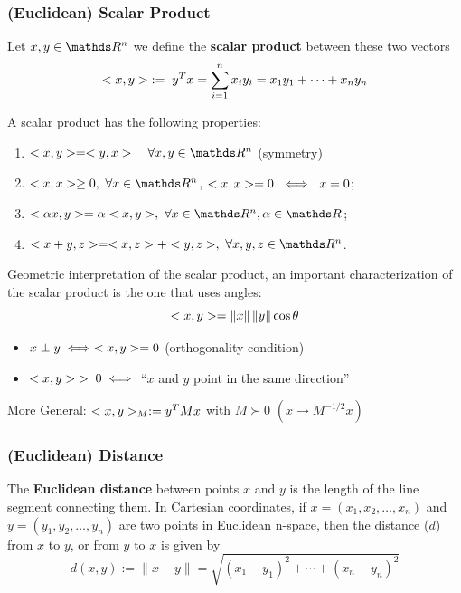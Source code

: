 \documentclass[computationalMathematics.tex]{subfiles}
\begin{document}


\subsubsection{(Euclidean) Scalar Product}

\begin{definition}
  Let $x, y \in \R^n$ we define the \textbf{scalar product} between these two vectors 
  \[
<x, y> \; := \; y^T x = \sum_{i=1}^n x_i y_i = x_1 y_1 + \cdots + x_n y_n
  \]
\end{definition}

\begin{proposition}
A scalar product has the following properties:
\begin{enumerate}
  \item $\ps{x}{y} = \ps{y}{x} \quad \forall x, y \in \R^n$ (symmetry)
  \item $\ps{x}{x} \ge 0,~\forall x \in \R^n$, $<x, x>=0~\iff~x=0$;
  \item $\ps{\alpha x}{y} = \alpha \ps{x}{y},~\forall x\in\R^n, \alpha \in \R$;
  \item $\ps{x + y}{z} = \ps{x}{z} + \ps{y}{z},~\forall x,y, z \in \R^n$.
\end{enumerate}
\end{proposition}

Geometric interpretation of the scalar product, an important characterization of the scalar product is the one that uses angles:
\[
  <x, y> = \left\lVert x\right\rVert \left\lVert y\right\rVert \cos \theta
\]
\begin{itemize}
    \item $x \perp y \iff <x, y> = 0$ (orthogonality condition)
    \item $<x, y> \; >\;  0 \iff$ ``$x$ and $y$ point in the same direction''
\end{itemize}

\noindent More General: $ <x, y>_M := {y}^{T}Mx $ with $M \succ 0$  $( x \longrightarrow M^{-1/2}x)$

\subsubsection{(Euclidean) Distance}
\begin{definition}
The \textbf{Euclidean distance} between points $x$ and $y$ is the length of the line segment connecting them. In Cartesian coordinates, if $x = (x_{1}, x_{2}, \ldots, x_{n})$ and $y = (y_{1}, y_{2}, \ldots, y_{n})$ are two points in Euclidean n-space, then the distance ($d$) from $x$ to $y$, or from $y$ to $x$ is given by
  \[
    d(x,y) := \lVert x - y \rVert = \sqrt{{(x_{1} - y_{1})}^{2} + \cdots + {(x_{n} - y_{n})}^{2}} 
  \]
  
\end{definition}
 
\end{document}
